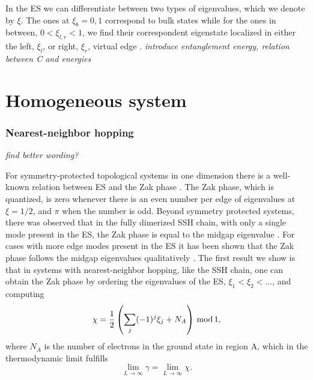 \documentclass[twocolumn,amsmath,longbibliography,amssymb,superscriptaddress]{revtex4-1}
\newcommand{\mariac}[1]{{\it\color{cyan}#1}}
\begin{document}
In the ES we can differentiate between two types of eigenvalues, which we denote by $\xi$. The ones at $\xi_b = 0,1$ correspond to bulk states while for the ones in between, $0<\xi_{l,r}<1$, we find their correspondent eigenstate localized in either the left, $\xi_l$, or right, $\xi_r$, virtual edge \cite{Peschel2008}. 
\mariac{introduce entanglement energy, relation between C and energies}
\section{Homogeneous system}

\subsubsection{Nearest-neighbor hopping}
\mariac{find better wording?}

For symmetry-protected topological systems in one dimension there is a well-known relation between ES and the Zak phase \cite{Peschel2008}. The Zak phase, which is quantized, is zero whenever there is an even number per edge of eigenvalues at $\xi = 1/2$, and $\pi$ when the number is odd. Beyond symmetry protected systems, there was observed that in the fully dimerized SSH chain, with only a single mode present in the ES, the Zak phase is equal to the midgap eigenvalue \cite{Ryu2006}. For cases with more edge modes present in the ES it has been shown that the Zak phase follows the midgap eigenvalues qualitatively \cite{Huang2012,Huang2012-2}. The first result we show is that in systems with nearest-neighbor hopping, like the SSH chain, one can obtain the Zak phase by ordering the eigenvalues of the ES, $\xi_1 < \xi_2 < ...$, and computing
\begin{equation}
\chi = \frac{1}{2}\left(\sum_j (-1)^j \xi_j+N_A\right) \, {\rm mod} \, 1,
\label{eqplusminus}
\end{equation}
where $N_A$ is the number of electrons in the ground state in region A, which in the thermodynamic limit fulfills
\begin{equation}
\lim_{L \rightarrow \infty} \gamma = \lim_{L \rightarrow \infty} \chi.
\end{equation}
\end{document}
